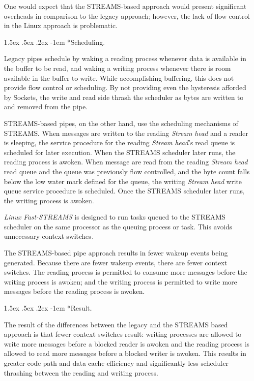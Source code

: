 \documentclass[letterpaper,final,notitlepage,twocolumn,10pt,twoside]{article}
\makeatletter
\renewcommand\paragraph{\@startsection{paragraph}{4}{\z@}%
                                    {1.5ex \@plus .5ex \@minus .2ex}%
                                    {-1em}%
                                    {\normalfont\normalsize\bfseries\slshape}}
\makeatother
\begin{document}
One would expect that the STREAMS-based approach would present significant
overheads in comparison to the legacy approach; however, the lack of flow
control in the Linux approach is problematic.

\paragraph*{Scheduling.}

Legacy pipes schedule by waking a reading process whenever data is available
in the buffer to be read, and waking a writing process whenever there is room
available in the buffer to write.  While accomplishing buffering, this does
not provide flow control or scheduling.  By not providing even the hysteresis
afforded by Sockets, the write and read side thrash the scheduler as bytes are
written to and removed from the pipe.

STREAMS-based pipes, on the other hand, use the scheduling mechanisms of
STREAMS.  When messages are written to the reading \textit{Stream head} and a
reader is sleeping, the service procedure for the reading \textit{Stream
head}'s read queue is scheduled for later execution.  When the STREAMS
scheduler later runs, the reading process is awoken.  When message are read
from the reading \textit{Stream head} read queue and the queue was previously
flow controlled, and the byte count falls below the low water mark defined for
the queue, the writing \textit{Stream head} write queue service procedure is
scheduled.  Once the STREAMS scheduler later runs, the writing process is
awoken.

\textsl{Linux Fast-STREAMS} is designed to run tasks queued to the STREAMS
scheduler on the same processor as the queuing process or task.  This avoids
unnecessary context switches.

The STREAMS-based pipe approach results in fewer wakeup events being
generated.  Because there are fewer wakeup events, there are fewer context
switches.  The reading process is permitted to consume more messages before
the writing process is awoken; and the writing process is permitted to write
more messages before the reading process is awoken.

\paragraph*{Result.}

The result of the differences between the legacy and the STREAMS based
approach is that fewer context switches result: writing processes are allowed
to write more messages before a blocked reader is awoken and the reading
process is allowed to read more messages before a blocked writer is awoken.
This results in greater code path and data cache efficiency and significantly
less scheduler thrashing between the reading and writing process.
\end{document}
